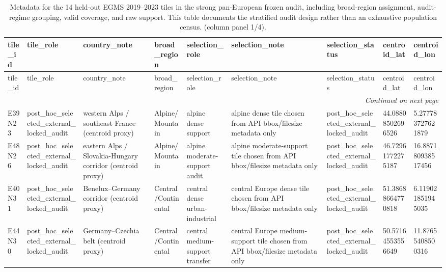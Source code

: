 \begin{landscape}
\scriptsize
\setlength{\LTleft}{0pt}
\setlength{\LTright}{0pt}
\begin{longtable}{lllllllll}
\caption{Metadata for the 14 held-out EGMS 2019--2023 tiles in the strong pan-European frozen audit, including broad-region assignment, audit-regime grouping, valid coverage, and raw support. This table documents the stratified audit design rather than an exhaustive population census. (column panel 1/4).}\label{tab:e7_strong_tile_metadata}\\
\toprule
tile\_id & tile\_role & country\_note & broad\_region & selection\_role & selection\_note & selection\_status & centroid\_lat & centroid\_lon \\
\midrule
\endfirsthead
\toprule
tile\_id & tile\_role & country\_note & broad\_region & selection\_role & selection\_note & selection\_status & centroid\_lat & centroid\_lon \\
\midrule
\endhead
\midrule
\multicolumn{9}{r}{\textit{Continued on next page}} \\
\endfoot
\bottomrule
\endlastfoot
E39N23 & post\_hoc\_selected\_external\_locked\_audit & western Alps / southeast France (centroid proxy) & Alpine/Mountain & alpine dense support & alpine dense tile chosen from API bbox/filesize metadata only & post\_hoc\_selected\_external\_locked\_audit & 44.08808502696526 & 5.277783727621879 \\
E48N26 & post\_hoc\_selected\_external\_locked\_audit & eastern Alps / Slovakia-Hungary corridor (centroid proxy) & Alpine/Mountain & alpine moderate-support audit & alpine moderate-support tile chosen from API bbox/filesize metadata only & post\_hoc\_selected\_external\_locked\_audit & 46.72961772275187 & 16.887180938517456 \\
E40N31 & post\_hoc\_selected\_external\_locked\_audit & Benelux–Germany corridor (centroid proxy) & Central/Continental & central dense urban-industrial & central Europe dense tile chosen from API bbox/filesize metadata only & post\_hoc\_selected\_external\_locked\_audit & 51.38688664770818 & 6.119021851945035 \\
E44N30 & post\_hoc\_selected\_external\_locked\_audit & Germany–Czechia belt (centroid proxy) & Central/Continental & central medium-support transfer & central Europe medium-support tile chosen from API bbox/filesize metadata only & post\_hoc\_selected\_external\_locked\_audit & 50.57164553556649 & 11.87655408500316 \\

\end{longtable}
\end{landscape}
